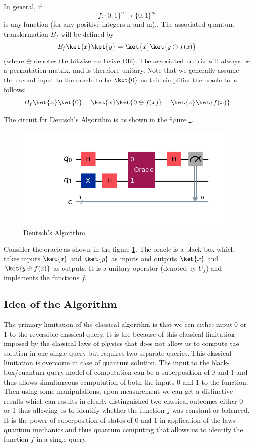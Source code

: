 \documentclass[12pt, oneside]{book}
\theoremstyle{definition}
\theoremstyle{definition}
\theoremstyle{remark}
\begin{document}
In general, if
\[
f:\{0,1\}^n\rightarrow \{0,1\}^m
\]
is any function (for any positive integers n and m).. The associated quantum transformation $B_f$ will be defined by
\[
B_f\ket{x}\ket{y}=\ket{x}\ket{y\oplus f(x)}
\]
(where $\oplus$ denotes the bitwise exclusive OR). The associated matrix will always be a permutation matrix, and is therefore unitary. Note that we generally assume the second input to the oracle to be $\ket{0}$ so this simplifies the oracle to as follows:
\[
B_f\ket{x}\ket{0}=\ket{x}\ket{0 \oplus f(x)}=\ket{x}\ket{f(x)}
\]

The circuit for Deutsch's Algorithm is as shown in the figure \ref{fig:deutsch}.
\begin{figure}[H]
    \centering
    \includegraphics[width=1\textwidth]{../images/deutsch.png}
    \caption{Deutsch's Algorithm}
    \label{fig:deutsch}
\end{figure}
Consider the oracle as shown in the figure \ref{fig:deutsch}. The oracle is a black box which takes inputs $\ket{x}$ and $\ket{y}$ as inputs 
and outputs $\ket{x}$ and $\ket{y\oplus f(x)}$ as outputs. It is a unitary operator (denoted by $U_f$) and implements the functions $f$.

\subsection{Idea of the Algorithm}
The primary limitation of the classical algorithm is that we can either input 0 or 1 to the reversible classical query. It is the because of this classical limitation imposed by the classical laws of physics that does not allow us to compute the solution in one single query but requires two separate queries. This classical limitation is overcome in case of quantum solution. The input to the black-box/quantum query model of computation can be a superposition of 0 and 1 and thus allows simultaneous computation of both the inputs 0 and 1 to the function. Then using some manipulations, upon measurement we can get a distinctive results which can results in clearly distinguished two classical outcomes either 0 or 1 thus allowing us to identify whether the function $f$ was constant or balanced. It is the power of superposition of states of 0 and 1 in application of the laws quantum mechanics and thus quantum computing that allows us to identify the function $f$ in a single query.
\end{document}
